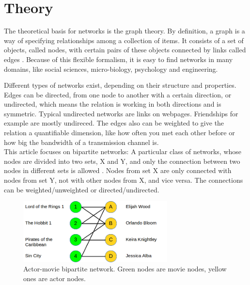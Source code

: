 \documentclass[
a4paper,     %
12pt         %
]{scrartcl}  %
\begin{document}

\section{Theory}
\label{sec:theory}

The theoretical basis for networks is the graph theory. By definition, a graph is a way of specifying relationships among a collection of items. It consists of a set of objects, called nodes, with certain pairs of these objects connected by links called edges \citep{easley_networks_2010}. Because of this flexible formalism, it is easy to find networks in many domains, like social sciences, micro-biology, psychology and engineering.

Different types of networks exist, depending on their structure and properties. Edges can be directed, from one node to another with a certain direction, or undirected, which means the relation is working in both directions and is symmetric. Typical undirected networks are links on webpages. Friendships for example are mostly undireced. The edges also can be weighted to give the relation a quantifiable dimension, like how often you met each other before or how big the bandwidth of a transmission channel is.\\

This article focuses on bipartite networks: A particular class of networks, whose nodes are divided into two sets, X and Y, and only the connection between two nodes in different sets is allowed \citep{easley_networks_2010}. Nodes from set X are only connected with nodes from set Y, not with other nodes from X, and vice versa. The connections can be weighted/unweighted or directed/undirected.

\begin{figure}[h!]
  \centering
  \includegraphics[width=0.7\textwidth]{./images/bipartite-actor-movie.png}
  \caption{Actor-movie bipartite network. Green nodes are movie nodes, yellow ones are actor nodes.}
  \label{fig:bipartite-network}
\end{figure}
\end{document}
